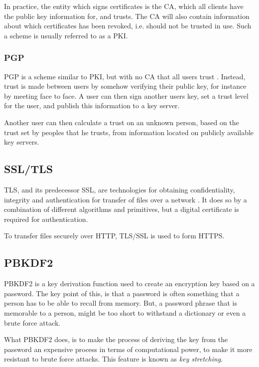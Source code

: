 \documentclass[pdftex,english,10pt,b5paper,twoside]{book}
\begin{document}
In practice, the entity which signs certificates is the \ac{CA}, which all
clients have the public key information for, and trusts. The \ac{CA} will also
contain information about which certificates has been revoked, i.e. should not
be trusted in use. Such a scheme is usually referred to as a \ac{PKI}.

\subsubsection{PGP}

\ac{PGP} is a scheme similar to \ac{PKI}, but with no \ac{CA} that all users
trust \cite{stallings}. Instead, trust is made between users by somehow
verifying their public key, for instance by meeting face to face. A user can
then sign another users key, set a trust level for the user, and publish this
information to a key server.

Another user can then calculate a trust on an unknown person, based on the trust
set by peoples that he trusts, from information located on publicly
available key servers.

\subsection{SSL/TLS}

\ac{TLS}, and its predecessor \ac{SSL}, are technologies for obtaining
confidentiality, integrity and authentication for transfer of files over a
network \cite{stallings}. It does so by a combination of different algorithms
and primitives, but a digital certificate is required for authentication.

To transfer files securely over \ac{HTTP}, \ac{TLS}/\ac{SSL} is used to form
\ac{HTTPS}. 

\subsection{PBKDF2}
\label{sec:PBKDF2}

\ac{PBKDF2} is a key derivation function used to create an encryption key based
on a password. The key point of this, is that a password is often something
that a person has to be able to recall from memory. But, a password phrase that
is memorable to a person, might be too short to withstand a dictionary or even
a brute force attack.

What \ac{PBKDF2} does, is to make the process of deriving the key from the password
an expensive process in terms of computational power, to make it more resistant
to brute force attacks. This feature is known as \emph{key stretching}. 
\end{document}
